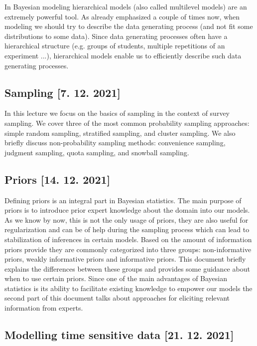 \documentclass[fleqn,moreauthors,10pt]{ds_report}
\begin{document}
In Bayesian modeling hierarchical models (also called multilevel models) are an extremely powerful tool. As already emphasized a couple of times now, when modeling we should try to describe the data generating process (and not fit some distributions to some data). Since data generating processes often have a hierarchical structure (e.g. groups of students, multiple repetitions of an experiment ...), hierarchical models enable us to efficiently describe such data generating processes.

\subsection*{Sampling [7. 12. 2021]}

In this lecture we focus on the basics of sampling in the context of survey sampling. We cover three of the most common probability sampling approaches: simple random sampling, stratified sampling, and cluster sampling. We also briefly discuss non-probability sampling methods: convenience sampling, judgment sampling, quota sampling, and snowball sampling.

\subsection*{Priors [14. 12. 2021]}

Defining priors is an integral part in Bayesian statistics. The main purpose of priors is to introduce prior expert knowledge about the domain into our models. As we know by now, this is not the only usage of priors, they are also useful for regularization and can be of help during the sampling process which can lead to stabilization of inferences in certain models. Based on the amount of information priors provide they are commonly categorized into three groups: non-informative priors, weakly informative priors and informative priors. This document briefly explains the differences between these groups and provides some guidance about when to use certain priors. Since one of the main advantages of Bayesian statistics is its ability to facilitate existing knowledge to empower our models the second part of this document talks about approaches for eliciting relevant information from experts.

\subsection*{Modelling time sensitive data [21. 12. 2021]}
\end{document}
